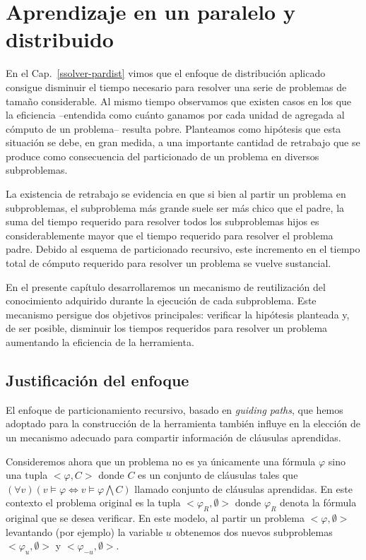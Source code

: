 \chapter{Aprendizaje en un \ssolver paralelo y distribuido}
\label{aprendizaje-pardist}

En el Cap.~\ref{ssolver-pardist} vimos que el enfoque de distribución aplicado
consigue disminuir el tiempo necesario para resolver una serie de problemas de
tamaño considerable. Al mismo tiempo observamos que existen casos en los que
la eficiencia --entendida como cuánto ganamos por cada unidad de \hard
agregada al cómputo de un problema-- resulta pobre. Planteamos como hipótesis
que esta situación se debe, en gran medida, a una importante cantidad de
retrabajo que se produce como consecuencia del particionado de un problema en
diversos subproblemas. 

La existencia de retrabajo se evidencia en que si bien al partir un problema
en subproblemas, el subproblema más grande suele ser más chico que el padre,
la suma del tiempo requerido para resolver todos los subproblemas hijos es
considerablemente mayor que el tiempo requerido para resolver el problema
padre. Debido al esquema de particionado recursivo, este incremento en el
tiempo total de cómputo requerido para resolver un problema se vuelve
sustancial.

En el presente capítulo desarrollaremos un mecanismo de reutilización del
conocimiento adquirido durante la ejecución de cada subproblema. Este
mecanismo persigue dos objetivos principales: verificar la hipótesis planteada
y, de ser posible,  disminuir los tiempos requeridos para resolver un problema
aumentando la eficiencia de la herramienta.

\section{Justificación del enfoque}

El enfoque de particionamiento recursivo, basado en \emph{guiding paths}, que
hemos adoptado para la construcción de la herramienta también influye en la
elección de un mecanismo adecuado para compartir información de cláusulas
aprendidas. 

\newcommand{\roottask}{\ensuremath{<\varphi_R, \emptyset>}\xspace}
\newcommand{\task}{\ensuremath{<\varphi, \emptyset>}\xspace}
\newcommand{\nonemptytask}{\ensuremath{<\varphi, \emptyset>}\xspace}

Consideremos ahora que un problema no es ya únicamente una fórmula $\varphi$
sino una tupla $<\varphi, C>$ donde $C$ es un conjunto de cláusulas tales que
$(\forall v) (v \models \varphi \Longleftrightarrow v \models \varphi
\bigwedge C)$ llamado conjunto de cláusulas aprendidas. En este contexto el
problema original es la tupla \roottask donde $\varphi_R$ denota la fórmula
original que se desea verificar. En este modelo, al partir un problema \task
levantando (por ejemplo) la variable $u$ obtenemos dos nuevos subproblemas
$<\varphi_u, \emptyset>$ y $<\varphi_{-u}, \emptyset>$. 

